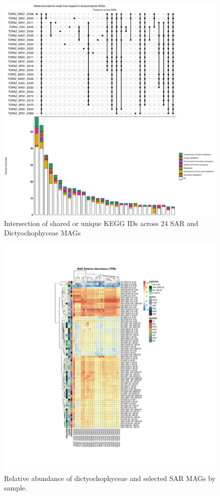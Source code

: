 \documentclass[12pt]{article}
\numberwithin{equation}{section}
\begin{document}
\begin{figure}
    \centering
    \includegraphics[width=0.95\columnwidth]{si-figures/SI-SAR-Dictyocho-MAG-KEGG-intersection.pdf}
    \caption{Intersection of shared or unique KEGG IDs across 24 SAR and Dictyochophyceae MAGs}
        \label{fig:dictyocho-SAR-intersect}
\end{figure}

\begin{figure}
    \centering
    \includegraphics[width=0.95\columnwidth]{si-figures/SI-SAR-Dictyocho-MAG-MAG-relabun-bysample.pdf}
    \caption{Relative abundance of dictyochophyceae and selected SAR MAGs by sample.}
    \label{fig:dictyocho-SAR-heatmap}
\end{figure}
\end{document}
